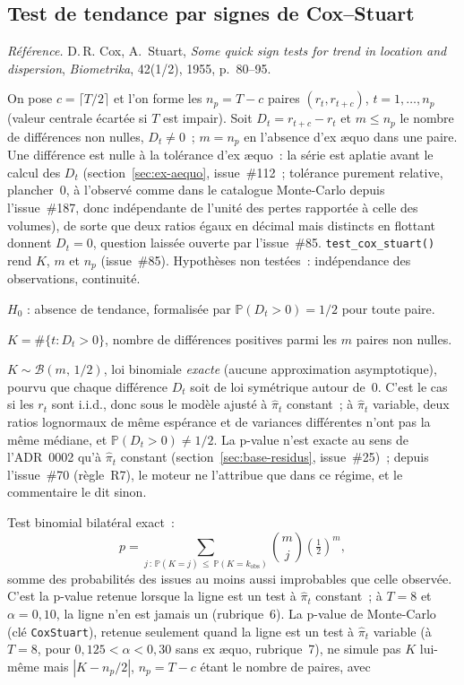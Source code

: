 \documentclass[a4paper,11pt]{article}
\newcommand{\code}[1]{\texttt{\small #1}}
\newcommand{\refl}[1]{{\small\textcolor{maincolor!70!black}{\textit{Référence.} #1}}\par\smallskip}
\newcounter{ficheid}
\newenvironment{fiche}[1]{%
  \stepcounter{ficheid}%
  \phantomsection
  \subsection{#1}%
  \label{fiche:\theficheid}%
}{%
  \end{description}\vspace{0.5em}%
}
\newcommand{\Cadre}{%
  \begin{description}[leftmargin=0pt, style=unboxed, itemsep=3pt, topsep=3pt, parsep=2pt]%
  \item[\textcolor{financeblue}{\textbf{1. Cadre, notations et hypothèses de validité (non testées).}}]}
\newcommand{\Hzero}{\item[\textcolor{financeblue}{\textbf{2. Hypothèse nulle.}}]}
\newcommand{\Stat}{\item[\textcolor{financeblue}{\textbf{3. Statistique de test.}}]}
\newcommand{\Loi}{\item[\textcolor{financeblue}{\textbf{4. Loi sous $H_0$.}}]}
\newcommand{\Pval}{\item[\textcolor{financeblue}{\textbf{5. p-value.}}]}
\begin{document}
\begin{fiche}{Test de tendance par signes de Cox--Stuart}
\label{fiche:cox-stuart}%
\refl{D.\,R. Cox, A.~Stuart, \emph{Some quick sign tests for trend in location and dispersion},
\emph{Biometrika}, 42(1/2), 1955, p.~80--95.}
\Cadre
On pose $c = \lceil T/2 \rceil$ et l'on forme les $n_p = T - c$ paires $(r_t, r_{t+c})$,
$t = 1, \dots, n_p$ (valeur centrale écartée si $T$ est impair). Soit $D_t = r_{t+c} - r_t$ et
$m \le n_p$ le nombre de différences non nulles, $D_t \neq 0$~; $m = n_p$ en l'absence d'ex \ae quo
dans une paire. Une différence est nulle à la tolérance d'ex \ae quo~: la série est aplatie
avant le calcul des $D_t$ (section~\ref{sec:ex-aequo}, issue~\#112~; tolérance purement relative,
plancher~0, à l'observé comme dans le catalogue Monte-Carlo depuis l'issue~\#187, donc
indépendante de l'unité des pertes rapportée à celle des volumes), de sorte que deux ratios égaux
en décimal mais distincts en flottant donnent $D_t = 0$, question laissée ouverte par
l'issue~\#85. \code{test\_cox\_stuart()} rend $K$, $m$ et $n_p$ (issue~\#85). Hypothèses non
testées~: indépendance des observations, continuité.
\Hzero
$H_0$ : absence de tendance, formalisée par $\mathbb{P}(D_t > 0) = 1/2$ pour toute paire.
\Stat
$K = \#\{t : D_t > 0\}$, nombre de différences positives parmi les $m$ paires non nulles.
\Loi
$K \sim \mathcal{B}(m,\,1/2)$, loi binomiale \emph{exacte} (aucune approximation asymptotique),
pourvu que chaque différence $D_t$ soit de loi symétrique autour de~0. C'est le cas si les $r_t$
sont i.i.d., donc sous le modèle ajusté à $\hat\pi_t$ constant~; à $\hat\pi_t$ variable, deux
ratios lognormaux de même espérance et de variances différentes n'ont pas la même médiane, et
$\mathbb{P}(D_t > 0) \ne 1/2$. La p-value n'est exacte au sens de l'ADR~0002 qu'à $\hat\pi_t$
constant (section~\ref{sec:base-residus}, issue~\#25)~; depuis l'issue~\#70 (règle~R7), le moteur
ne l'attribue que dans ce régime, et le commentaire le dit sinon.
\Pval
Test binomial bilatéral exact~:
\[
  p = \sum_{j\,:\,\mathbb{P}(K=j)\,\le\,\mathbb{P}(K=k_{\text{obs}})} \binom{m}{j}\left(\tfrac12\right)^{m},
\]
somme des probabilités des issues au moins aussi improbables que celle observée. C'est la
p-value retenue lorsque la ligne est un test à $\hat\pi_t$ constant~; à $T = 8$ et
$\alpha = 0{,}10$, la ligne n'en est jamais un (rubrique~6). La p-value de Monte-Carlo (clé
\code{CoxStuart}), retenue seulement quand la ligne est un test à $\hat\pi_t$ variable (à $T = 8$,
pour $0{,}125 < \alpha < 0{,}30$ sans ex \ae quo, rubrique~7), ne simule pas
$K$ lui-même mais $|K - n_p/2|$, $n_p = T - c$ étant le nombre de paires, avec

\end{fiche}
\end{document}
